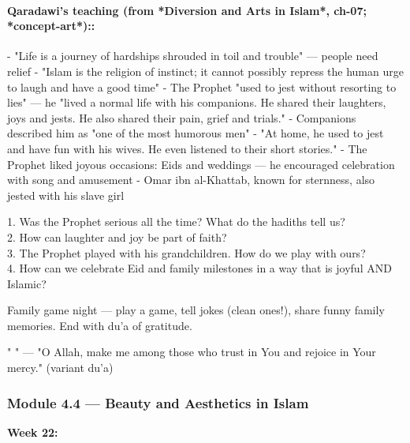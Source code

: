 \documentclass[11pt,a4paper]{article}
\begin{document}
\paragraph*{Qaradawi's teaching (from *Diversion and Arts in Islam*, ch-07; *concept-art*)::}  - "Life is a journey of hardships shrouded in toil and trouble" --- people need relief - "Islam is the religion of instinct; it cannot possibly repress the human urge to laugh and have a good time" - The Prophet "used to jest without resorting to lies" --- he "lived a normal life with his companions. He shared their laughters, joys and jests. He also shared their pain, grief and trials." - Companions described him as "one of the most humorous men" - "At home, he used to jest and have fun with his wives. He even listened to their short stories." - The Prophet liked joyous occasions: Eids and weddings --- he encouraged celebration with song and amusement - Omar ibn al-Khattab, known for sternness, also jested with his slave girl

\begin{discussionbox} 1. Was the Prophet serious all the time? What do the hadiths tell us? \\ 2. How can laughter and joy be part of faith? \\ 3. The Prophet played with his grandchildren. How do we play with ours? \\ 4. How can we celebrate Eid and family milestones in a way that is joyful AND Islamic? \end{discussionbox}

\begin{activitybox} Family game night --- play a game, tell jokes (clean ones!), share funny family memories. End with du'a of gratitude. \end{activitybox}

\begin{duabox} "      " --- "O Allah, make me among those who trust in You and rejoice in Your mercy." (variant du'a) \end{duabox}

\vspace{6pt}\noindent{\color{border}\rule{\textwidth}{0.5pt}}\vspace{6pt}

\subsubsection*{Module 4.4 --- Beauty and Aesthetics in Islam}
\textbf{Week 22:} 
\end{document}
